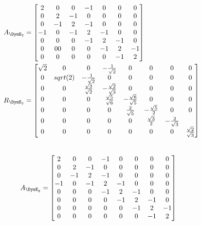  \begin{align*}
 A_{\DynE_{7}} &  =  \begin{bmatrix}
 2 & 0 & 0 & -1 & 0 & 0 & 0\\
 0 & 2 & -1 & 0 & 0 & 0 & 0\\
 0 & -1 & 2 & -1 & 0 & 0 & 0\\
 -1 & 0 & -1 & 2 & -1 & 0 & 0\\
 0 & 0 & 0 & -1 & 2 & -1 & 0\\
 0 & 0 0 & 0 & 0 & -1 & 2 & -1\\
 0 & 0 & 0 & 0 & 0 & -1 & 2\\
 \end{bmatrix}\\
 R_{\DynE_{7}} &  =  \begin{bmatrix}
 \sqrt{2} & 0 & 0 & -\frac{1}{\sqrt{2}} & 0 & 0 & 0 & 0\\
 0 & sqrt(2) & - \frac{1}{\sqrt{2}}& 0 & 0 & 0 & 0 & 0\\
 0 & 0 & \frac{\sqrt{3}}{\sqrt{2}} & -\frac{\sqrt{2}}{\sqrt{3}} & 0 & 0 & 0 & 0\\
 0 & 0 & 0 & \frac{\sqrt{5}}{\sqrt{6}} & -\frac{\sqrt{6}}{\sqrt{5}} & 0 & 0 & 0\\
 0 & 0 & 0 & 0 & \frac{2}{\sqrt{5}} & -\frac{\sqrt{5}}{2} & 0 & 0\\
 0 & 0 & 0 & 0 & 0 & \frac{\sqrt{3}}{2} & -\frac{2}{\sqrt{3}}\\
 0 & 0 & 0 & 0 & 0 & 0 & 0 & \frac{\sqrt{2}}{\sqrt{3}}\\
 \end{bmatrix}
 \end{align*}\\
 \begin{align*}
 A_{\DynE_{8}} &  = \begin{bmatrix}
 2 & 0 & 0 & -1 & 0 & 0 & 0 & 0\\
 0 & 2 & -1 & 0 & 0 & 0 & 0 & 0\\
 0 & -1 & 2 & -1 & 0 & 0 & 0 & 0\\
 -1 & 0 & -1 & 2 & -1 & 0 & 0 & 0\\
 0 & 0 & 0 & -1 & 2 & -1 & 0 & 0 \\
 0 & 0 & 0 & 0 & -1 & 2 & -1 & 0\\
 0 & 0 & 0 & 0 & 0 & -1 & 2 & -1\\
 0 & 0 & 0 & 0 & 0 & 0 & -1 & 2\\
 \end{bmatrix}
\end{align*}
